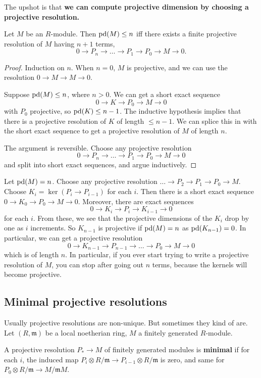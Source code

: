 The upshot is that \textbf{we can compute projective dimension
by choosing a
projective resolution.}
\begin{proposition}
Let $M$ be an $R$-module. Then $\mathrm{pd}(M) \leq n$ iff there exists
a finite
projective resolution of $M$ having $n+1$ terms,
\[ 0 \to P_n \to \dots \to P_1 \to P_0 \to M \to 0.  \]
\end{proposition}
\begin{proof}
Induction on $n$. When $n = 0$, $M$ is projective, and we can
use the
resolution $0 \to M \to M \to 0$.

Suppose $\mathrm{pd}(M) \leq n$, where $n >0$. We can get a short exact
sequence
\[ 0 \to K \to P_0 \to M \to 0  \]
with $P_0$ projective, so $\mathrm{pd}(K) \leq n-1$. The inductive
hypothesis implies
that there is a projective resolution of $K$ of length $\leq
n-1$. We can
splice this in with the short exact sequence to get a projective
resolution of
$M$ of length $n$.

The argument is reversible. Choose any projective resolution
\[  0 \to P_n \to \dots \to P_1 \to P_0 \to M \to 0 \]
and split into short exact sequences, and argue inductively.
\end{proof}


Let $\mathrm{pd}(M) = n$. Choose any projective resolution $\dots \to
P_2 \to P_1 \to
P_0 \to M$. Choose $K_i = \ker(P_i \to P_{i-1})$ for each $i$.
Then there is a short exact sequence $0 \to K_0 \to P_0 \to M
\to 0$. Moreover,
there are exact sequences
\[ 0 \to K_i \to P_i \to K_{i-1} \to 0  \]
for each $i$. From these, we see that the projective dimensions
of the $K_i$
drop by one as $i$ increments. So $K_{n-1}$ is projective if
$\mathrm{pd}(M) = n$ as
$\mathrm{pd}(K_{n-1})=0$. In particular, we can get a projective
resolution
\[ 0 \to K_{n-1} \to P_{n-1} \to \dots \to P_0 \to M \to 0  \]
which is of length $n$.
In particular, if you ever start trying to write a projective
resolution of
$M$, you can stop after going out $n$ terms, because the kernels
will become
projective.


\subsection{Minimal projective resolutions}
Usually projective resolutions are non-unique. But sometimes
they kind of are.
Let $(R, \mathfrak{m})$ be a local noetherian ring, $M$ a
finitely generated $R$-module.

\begin{definition}
A projective resolution $P_* \to M$ of finitely generated
modules is \textbf{minimal} if for each $i$, the
induced map $P_i \otimes R/\mathfrak{m} \to P_{i-1} \otimes
R/\mathfrak{m}$ is
zero, and same for $P_0 \otimes R/\mathfrak{m} \to
M/\mathfrak{m}M$.
\end{definition}

